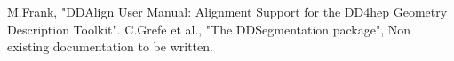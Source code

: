 \documentclass[10pt,a4paper]{article}
\begin{document}
\newpage
\begin{thebibliography}{9}

 M.Frank,
                   "DDAlign User Manual: 
                   Alignment Support for the DD4hep Geometry Description Toolkit".
 C.Grefe et al.,
                   "The DDSegmentation package", 
                   Non existing documentation to be written.
\end{thebibliography}
\end{document}
